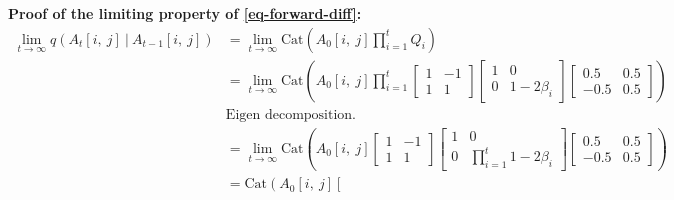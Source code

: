 \documentclass[
  11pt,
  letterpaper,
]{article}
\begin{document}
\textbf{Proof of the limiting property of \ref{eq-forward-diff}:}
\begin{align*}
         \lim_{t \to \infty} q(A_t[i, \ j] \ | \ A_{t-1}[i, \ j]) 
            &= \lim_{t \to \infty} \text{Cat}\left(A_0[i, \ j] \prod_{i=1}^t Q_i \right) \\
            &= \lim_{t \to \infty} \text{Cat}
            \left(A_0[i, \ j] 
                \prod_{i=1}^t  
                \left[
                \begin{matrix}
                    1  & -1 \\
                    1 & 1
                \end{matrix}
                \right]
                \left[
                \begin{matrix}
                    1  &  0 \\
                    0 & 1-2\beta_i
                \end{matrix}
                \right]
                \left[
                \begin{matrix}
                    0.5  &  0.5 \\
                    -0.5 & 0.5
                \end{matrix}
                \right]
            \right) \\ 
            &\text{Eigen decomposition.} \\ 
            &= \lim_{t \to \infty} \text{Cat}
            \left(A_0[i, \ j] 
                \left[
                \begin{matrix}
                    1  & -1 \\
                    1 & 1
                \end{matrix}
                \right]
                \left[
                \begin{matrix}
                    1  &  0 \\
                    0 & \prod_{i=1}^t 1-2\beta_i
                \end{matrix}
                \right]
                \left[
                \begin{matrix}
                    0.5  &  0.5 \\
                    -0.5 & 0.5
                \end{matrix}
                \right]
            \right) \\ 
            &= \text{Cat}
            \left(A_0[i, \ j] 
                \left[
                \begin{matrix}

\end{matrix}
\end{align*}
\end{document}
